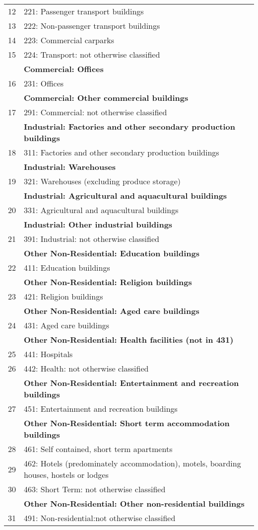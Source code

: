 \begin{table}
{\begin{tabular}{|c|p{}|}
12 & 221:  Passenger transport buildings\\
13 & 222:  Non-passenger transport buildings\\
14 & 223:  Commercial carparks\\
15 & 224:  Transport: not otherwise classified\\
& \textbf{Commercial: Offices} \\
16 & 231:  Offices \\
& \textbf{Commercial: Other commercial buildings} \\
17 & 291:  Commercial: not otherwise classified\\
& \textbf{Industrial: Factories and other secondary production buildings} \\
18 & 311:  Factories and other secondary production buildings \\
& \textbf{Industrial: Warehouses} \\
19 & 321:  Warehouses (excluding produce storage) \\
& \textbf{Industrial: Agricultural and aquacultural buildings} \\
20 & 331:  Agricultural and aquacultural buildings \\
& \textbf{Industrial: Other industrial buildings} \\
21 & 391:  Industrial: not otherwise classified\\
\hline
& \textbf{Other Non-Residential: Education buildings} \\
22 & 411:  Education buildings \\
& \textbf{Other Non-Residential: Religion buildings} \\
23 & 421:  Religion buildings \\
& \textbf{Other Non-Residential: Aged care buildings} \\
24 & 431:  Aged care buildings \\
& \textbf{Other Non-Residential: Health facilities (not in 431)} \\
25 & 441:  Hospitals \\
26 & 442:  Health: not otherwise classified\\
& \textbf{Other Non-Residential: Entertainment and recreation buildings} \\
27 & 451:  Entertainment and recreation buildings \\
& \textbf{Other Non-Residential: Short term accommodation buildings} \\
28 & 461:  Self contained, short term apartments\\
29 & 462:  Hotels (predominately accommodation), motels, boarding houses, hostels or lodges\\
30 & 463:  Short Term: not otherwise classified\\
& \textbf{Other Non-Residential: Other non-residential buildings} \\
31 & 491:  Non-residential:not otherwise classified\\
\hline
\end{tabular}
}
\end{table}



